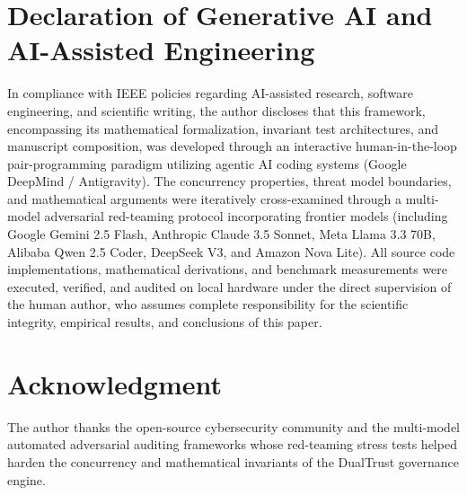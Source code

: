 \documentclass[journal]{IEEEtran}
\begin{document}
\section*{Declaration of Generative AI and AI-Assisted Engineering}
In compliance with IEEE policies regarding AI-assisted research, software engineering, and scientific writing, the author discloses that this framework, encompassing its mathematical formalization, invariant test architectures, and manuscript composition, was developed through an interactive human-in-the-loop pair-programming paradigm utilizing agentic AI coding systems (Google DeepMind / Antigravity). The concurrency properties, threat model boundaries, and mathematical arguments were iteratively cross-examined through a multi-model adversarial red-teaming protocol incorporating frontier models (including Google Gemini 2.5 Flash, Anthropic Claude 3.5 Sonnet, Meta Llama 3.3 70B, Alibaba Qwen 2.5 Coder, DeepSeek V3, and Amazon Nova Lite). All source code implementations, mathematical derivations, and benchmark measurements were executed, verified, and audited on local hardware under the direct supervision of the human author, who assumes complete responsibility for the scientific integrity, empirical results, and conclusions of this paper.

\section*{Acknowledgment}
The author thanks the open-source cybersecurity community and the multi-model automated adversarial auditing frameworks whose red-teaming stress tests helped harden the concurrency and mathematical invariants of the DualTrust governance engine.



\end{document}

